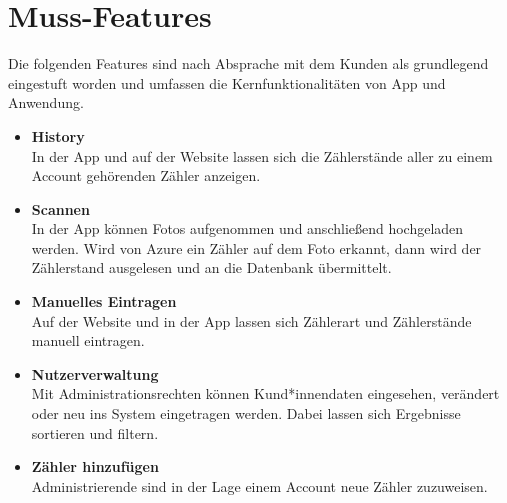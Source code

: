 \section{Muss-Features}
Die folgenden Features sind nach Absprache mit dem Kunden als grundlegend eingestuft worden und umfassen die Kernfunktionalitäten von App und Anwendung.
\begin{itemize}
\item \textbf{History} \hfill \\
	In der App und auf der Website lassen sich die Zählerstände aller zu einem Account gehörenden Zähler anzeigen.
\item \textbf{Scannen} \hfill \\
	In der App können Fotos aufgenommen und anschließend hochgeladen werden. 
	Wird von Azure ein Zähler auf dem Foto erkannt, dann wird der Zählerstand ausgelesen und an die Datenbank übermittelt.
\item \textbf{Manuelles Eintragen} \hfill \\
	Auf der Website und in der App lassen sich Zählerart und Zählerstände manuell eintragen.
\item \textbf{Nutzerverwaltung} \hfill \\
	Mit Administrationsrechten können Kund*innendaten eingesehen, verändert oder neu ins System eingetragen werden.
	Dabei lassen sich Ergebnisse sortieren und filtern.
\item \textbf{Zähler hinzufügen} \hfill \\
	Administrierende sind in der Lage einem Account neue Zähler zuzuweisen.	
\end{itemize}


